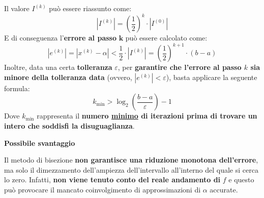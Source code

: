\noindent
Il valore $I^{(k)}$ può essere riassunto come:
\begin{equation*}
    \left|I^{(k)}\right| = \left(\dfrac{1}{2}\right)^{k} \cdot \left| I^{(0)} \right|
\end{equation*}
E di conseguenza l'\textbf{errore al passo} $\bm{k}$ può essere calcolato come:
\begin{equation*}
    \left| e^{(k)} \right| = \left| x^{(k)} - \alpha \right| < \dfrac{1}{2} \cdot \left| I^{(k)} \right| = \left(\dfrac{1}{2}\right)^{k+1} \cdot \left(b-a\right)
\end{equation*}
Inoltre, data una certa \textbf{tolleranza} $\varepsilon$, per \textbf{garantire che l'errore al passo $k$ sia minore della tolleranza data} (ovvero, $\left| e^{(k)} \right| < \varepsilon$), basta applicare la seguente formula:
\begin{equation}
    k_{\min} > \log_{2} \left(\dfrac{b-a}{\varepsilon}\right) - 1
\end{equation}
Dove $k_{\min}$ rappresenta il \textbf{numero \underline{minimo} di iterazioni prima di trovare un intero che soddisfi la disuguaglianza}.

\begin{flushleft}
    \textcolor{Red2}{ \textbf{Possibile svantaggio}}
\end{flushleft}
Il metodo di bisezione \textbf{non garantisce una riduzione monotona dell'errore}, ma solo il dimezzamento dell'ampiezza dell'intervallo all'interno del quale si cerca lo zero. Infatti, \textbf{non viene tenuto conto del reale andamento di} $f$ e questo può provocare il mancato coinvolgimento di approssimazioni di $\alpha$ accurate.